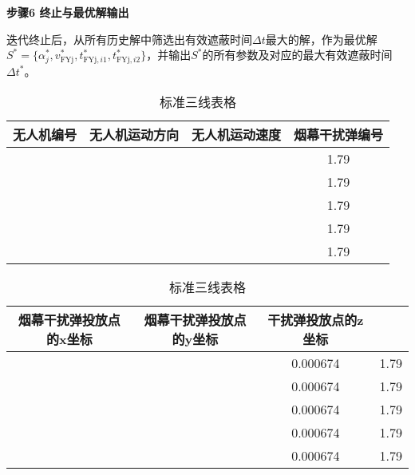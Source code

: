 \documentclass[../main.tex]{subfiles}
\begin{document}
\noindent\textbf{步骤6 终止与最优解输出}

迭代终止后，从所有历史解中筛选出有效遮蔽时间$\Delta t$最大的解，作为最优解$S^*=\{\alpha_j^*, v_{\text{FYj}}^*, t_{\text{FYj},i1}^*, t_{\text{FYj},i2}^*\}$，并输出$S^*$的所有参数及对应的最大有效遮蔽时间$\Delta t^*$。





\begin{table}[H]
\caption{标准三线表格}
\label{tab:001} 
\centering
\begin{small}
\begin{tabular}{cccc}
\toprule[1.5pt]
无人机编号 &无人机运动方向 & 无人机运动速度  &烟幕干扰弹编号     \\  
\midrule[1pt]
 &             &                      & 1.79              \\            
 &             &                       & 1.79                       \\           
 &             &                     & 1.79                       \\           
 &             &                     & 1.79                   \\          
 &             &                    & 1.79               \\            
\bottomrule[1.5pt]
\end{tabular}
\end{small}
\end{table}


\begin{table}[H]
\caption{标准三线表格}
\label{tab:031} 
\centering
\begin{small}
\begin{tabular}{cccc}
\toprule[1.5pt]
烟幕干扰弹投放点的x坐标& 烟幕干扰弹投放点的y坐标    &干扰弹投放点的z坐标 \\
\midrule[1pt]
             &                   & 0.000674     & 1.79     \\               
             &                   & 0.000674     & 1.79       \\               
             &                   & 0.000674     & 1.79    \\                
             &                   & 0.000674     & 1.79      \\                
             &                   & 0.000674     & 1.79       \\               
\bottomrule[1.5pt]
\end{tabular}
\end{small}
\end{table}
\end{document}
